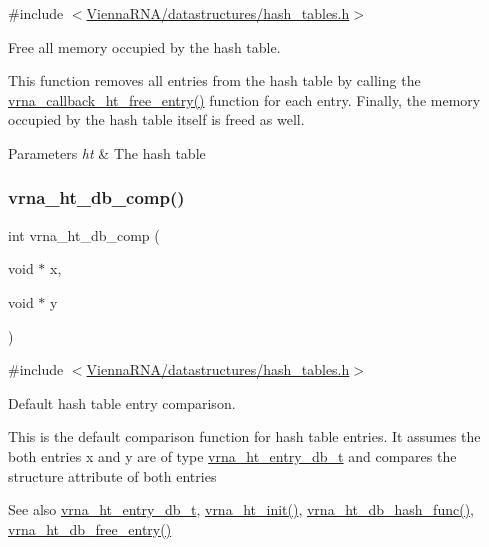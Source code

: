 {\ttfamily \#include $<$\hyperlink{hash__tables_8h}{Vienna\+R\+N\+A/datastructures/hash\+\_\+tables.\+h}$>$}



Free all memory occupied by the hash table. 

This function removes all entries from the hash table by calling the \hyperlink{group__hash__table__utils_ga3ff18cc70db8bb6f8cfee2c2b1542afc}{vrna\+\_\+callback\+\_\+ht\+\_\+free\+\_\+entry()} function for each entry. Finally, the memory occupied by the hash table itself is free\textquotesingle{}d as well.


\begin{DoxyParams}{Parameters}
{\em ht} & The hash table \\
\hline
\end{DoxyParams}
\mbox{\label{group__hash__table__utils_gac4ec0b8372d50d7347a63f140f340962}} 
\subsubsection{\texorpdfstring{vrna\+\_\+ht\+\_\+db\+\_\+comp()}{vrna\_ht\_db\_comp()}}
{\footnotesize\ttfamily int vrna\+\_\+ht\+\_\+db\+\_\+comp (\begin{DoxyParamCaption}\item[{void $\ast$}]{x,  }\item[{void $\ast$}]{y }\end{DoxyParamCaption})}



{\ttfamily \#include $<$\hyperlink{hash__tables_8h}{Vienna\+R\+N\+A/datastructures/hash\+\_\+tables.\+h}$>$}



Default hash table entry comparison. 

This is the default comparison function for hash table entries. It assumes the both entries {\ttfamily x} and {\ttfamily y} are of type \hyperlink{group__hash__table__utils_structvrna__ht__entry__db__t}{vrna\+\_\+ht\+\_\+entry\+\_\+db\+\_\+t} and compares the {\ttfamily structure} attribute of both entries

\begin{DoxySeeAlso}{See also}
\hyperlink{group__hash__table__utils_structvrna__ht__entry__db__t}{vrna\+\_\+ht\+\_\+entry\+\_\+db\+\_\+t}, \hyperlink{group__hash__table__utils_ga37d1c7e13087a2b7c1b87fda34577c29}{vrna\+\_\+ht\+\_\+init()}, \hyperlink{group__hash__table__utils_gad133721a3cd2f8ca259fe315d86035a7}{vrna\+\_\+ht\+\_\+db\+\_\+hash\+\_\+func()}, \hyperlink{group__hash__table__utils_gabcdcd0d070b3dfd2634a09e7838acf66}{vrna\+\_\+ht\+\_\+db\+\_\+free\+\_\+entry()}
\end{DoxySeeAlso}

